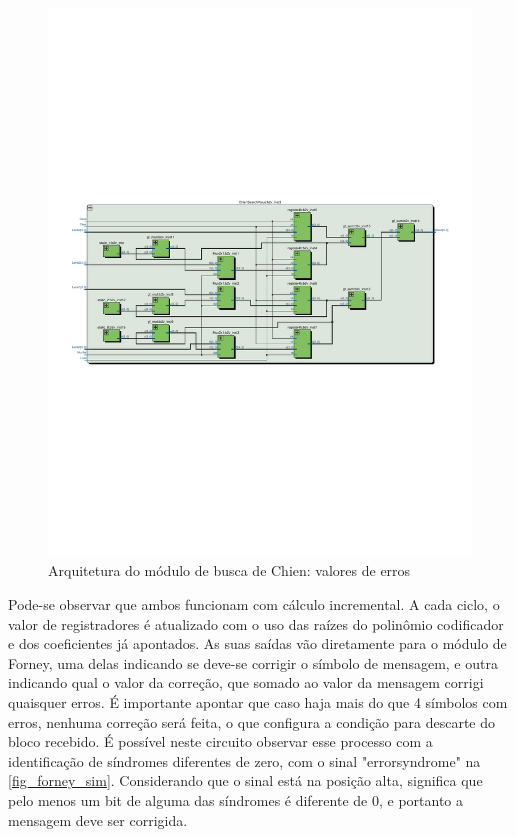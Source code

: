 	\begin{figure}[!htb]
		\caption{\label{fig_chienval_arq} Arquitetura do módulo de busca de Chien: valores de erros}
		\centering
		\includegraphics[width=1\textwidth]{RS/ChienValueRTL.pdf}
		\legend{}
	\end{figure}
	
	Pode-se observar que ambos funcionam com cálculo incremental. A cada ciclo, o valor de registradores é atualizado com o uso das raízes do polinômio codificador e dos coeficientes já apontados. As suas saídas vão diretamente para o módulo de Forney, uma delas indicando se deve-se corrigir o símbolo de mensagem, e outra indicando qual o valor da correção, que somado ao valor da mensagem corrigi quaisquer erros. É importante apontar que caso haja mais do que 4 símbolos com erros, nenhuma correção será feita, o que configura a condição para descarte do bloco recebido. É possível neste circuito observar esse processo com a identificação de síndromes diferentes de zero, com o sinal "errorsyndrome" na \autoref{fig_forney_sim}. Considerando que o sinal está na posição alta, significa que pelo menos um bit de alguma das síndromes é diferente de 0, e portanto a mensagem deve ser corrigida. 
	
